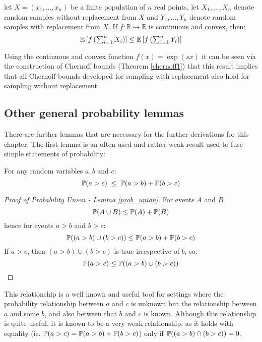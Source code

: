 \begin{lemma}\label{hoeffdings_reduction}
let $X=(x_1,\dots,x_n)$ be a finite population of $n$ real points, let $X_1,\dots,X_n$ denote random samples without replacement from $X$ and $Y_1,\dots,Y_n$ denote random samples with replacement from $X$. 
If $f:\mathbb{R}\rightarrow\mathbb{R}$ is continuous and convex, then:
$$\textstyle \operatorname{\mathbb{E}}\left[f\left(\sum_{i=1}^nX_i\right)\right]\le\operatorname{\mathbb{E}}\left[f\left(\sum_{i=1}^nY_i\right)\right] $$
\end{lemma}

Using the continuous and convex function $f(x)=\exp(sx)$ it can be seen via the construction of Chernoff bounds (Theorem \ref{chernoff1}) that this result implies that all Chernoff bounds developed for sampling with replacement also hold for sampling without replacement.



\subsection{Other general probability lemmas}

There are further lemmas that are necessary for the further derivations for this chapter.
The first lemma is an often-used and rather weak result used to fuse simple statements of probability:
\begin{lemma}\label{prob_union}
For any random variables $a,b$ and $c$:
\[\operatorname{\mathbb{P}}(a>c) \; \le \; \operatorname{\mathbb{P}}(a>b) + \operatorname{\mathbb{P}}(b>c)\]
\end{lemma}
\begin{proof}[Proof of Probability Union - Lemma \ref{prob_union}]
For events $A$ and $B$
$$\operatorname{\mathbb{P}}(A\cup B) \le \operatorname{\mathbb{P}}(A)+\operatorname{\mathbb{P}}(B)$$
hence for events $a>b$ and $b>c$: $$\operatorname{\mathbb{P}}((a>b) \cup (b>c)) \le \operatorname{\mathbb{P}}(a>b) + \operatorname{\mathbb{P}}(b>c)$$
If $a>c$, then $(a>b) \cup (b>c)$ is true irrespective of $b$, so:
$$\operatorname{\mathbb{P}}(a>c) \le \operatorname{\mathbb{P}}((a>b) \cup (b>c))$$
\end{proof}
This relationship is a well known and useful tool for settings where the probability relationship between $a$ and $c$ is unknown but the relationship between $a$ and some $b$, and also between that $b$ and $c$ is known.
Although this relationship is quite useful, it is known to be a very weak relationship, as it holds with equality (ie. $\operatorname{\mathbb{P}}(a>c)=\operatorname{\mathbb{P}}(a>b)+\operatorname{\mathbb{P}}(b>c)$) only if $\operatorname{\mathbb{P}}((a>b)\cap(b>c))=0$.

